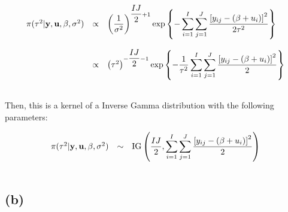 \documentclass{article}
\begin{document}
\begin{equation*}
\begin{array}{lcl ll }
\pi(\tau^2|\textbf{y}, \textbf{u},\beta,\sigma^2) & \propto & \left(\dfrac{1}{\sigma^2}\right)^{\dfrac{IJ}{2} + 1} \mbox{exp}\left\{ - \displaystyle\sum_{i=1}^{I}\sum_{j=1}^{J}\frac{\left[ y_{ij} - (\beta + u_i) \right]^2}{2\tau^2} \right\} \\\\

 & \propto & \left(\tau^2\right)^{-\dfrac{IJ}{2} - 1} \mbox{exp}\left\{ - \dfrac{1}{\tau^2} \displaystyle\sum_{i=1}^{I}\sum_{j=1}^{J}\frac{\left[ y_{ij} - (\beta + u_i) \right]^2}{2}\right\} \\\\

 \end{array}
\end{equation*}

Then, this is a kernel of a Inverse Gamma distribution with the following parameters:

\begin{equation*}
\begin{array}{lcl ll }

\pi(\tau^2|\textbf{y}, \textbf{u},\beta,\sigma^2) & \sim &  \mbox{IG} \left( \dfrac{IJ}{2} , \displaystyle\sum_{i=1}^{I}\sum_{j=1}^{J}\frac{\left[ y_{ij} - (\beta + u_i) \right]^2}{2} \right)  \\\\

 \end{array}
\end{equation*}

\subsection{(b)}
\end{document}
